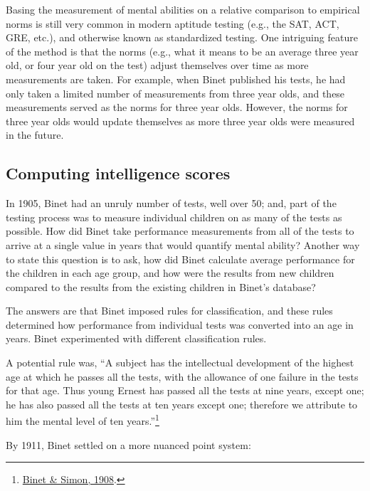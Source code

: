 \documentclass[
  oneside,
  12pt]{crumpbook}
\begin{document}
Basing the measurement of mental abilities on a relative comparison to empirical norms is still very common in modern aptitude testing (e.g., the SAT, ACT, GRE, etc.), and otherwise known as standardized testing. One intriguing feature of the method is that the norms (e.g., what it means to be an average three year old, or four year old on the test) adjust themselves over time as more measurements are taken. For example, when Binet published his tests, he had only taken a limited number of measurements from three year olds, and these measurements served as the norms for three year olds. However, the norms for three year olds would update themselves as more three year olds were measured in the future.

\hypertarget{computing-intelligence-scores}{%
\subsection{Computing intelligence scores}\label{computing-intelligence-scores}}

In 1905, Binet had an unruly number of tests, well over 50; and, part of the testing process was to measure individual children on as many of the tests as possible. How did Binet take performance measurements from all of the tests to arrive at a single value in years that would quantify mental ability? Another way to state this question is to ask, how did Binet calculate average performance for the children in each age group, and how were the results from new children compared to the results from the existing children in Binet's database?

The answers are that Binet imposed rules for classification, and these rules determined how performance from individual tests was converted into an age in years. Binet experimented with different classification rules.

A potential rule was, ``A subject has the intellectual development of the highest age at which he passes all the tests, with the allowance of one failure in the tests for that age. Thus young Ernest has passed all the tests at nine years, except one; he has also passed all the tests at ten years except one; therefore we attribute to him the mental level of ten years.''\footnote{\protect\hyperlink{ref-binetDevelopmentIntelligenceChild1908}{Binet \& Simon, 1908}.}

By 1911, Binet settled on a more nuanced point system:
\end{document}
